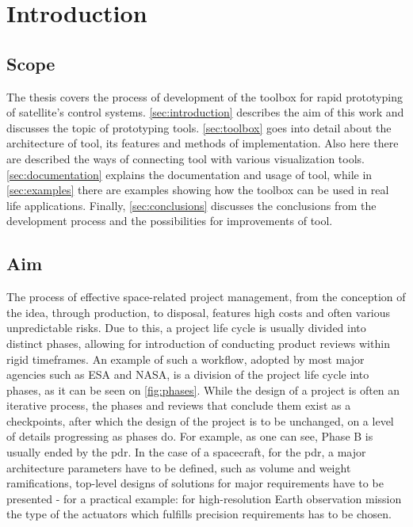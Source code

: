 \section{Introduction}\label{sec:introduction}

\subsection{Scope}
    The thesis covers the process of development of the toolbox for rapid prototyping of satellite's control systems. \autoref{sec:introduction} describes the aim of this work and discusses the topic of prototyping tools. \autoref{sec:toolbox} goes into detail about the architecture of \ac{tool}, its features and methods of implementation. Also here there are described the ways of connecting \ac{tool} with various visualization tools. \autoref{sec:documentation} explains the documentation and usage of \ac{tool}, while in \autoref{sec:examples} there are examples showing how the toolbox can be used in real life applications. Finally, \autoref{sec:conclusions} discusses the conclusions from the development process and the possibilities for improvements of \ac{tool}.

\subsection{Aim}
    The process of effective space-related project management, from the conception of the idea, through production, to disposal, features high costs and often various unpredictable risks. Due to this, a project life cycle is usually divided into distinct phases, allowing for introduction of conducting product reviews within rigid timeframes. An example of such a workflow, adopted by most major agencies such as ESA\cite{managementecss} and NASA\cite{kapurch2010nasa}, is a division of the project life cycle into phases, as it can be seen on \autoref{fig:phases}. While the design of a project is often an iterative process, the phases and reviews that conclude them exist as a checkpoints, after which the design of the project is to be unchanged, on a level of details progressing as phases do. For example, as one can see, Phase B is usually ended by the \ac{pdr}. In the case of a spacecraft, for the \ac{pdr}, a major architecture parameters have to be defined, such as volume and weight ramifications, top-level designs of solutions for major requirements have to be presented - for a practical example: for high-resolution Earth observation mission the type of the actuators which fulfills precision requirements has to be chosen.

